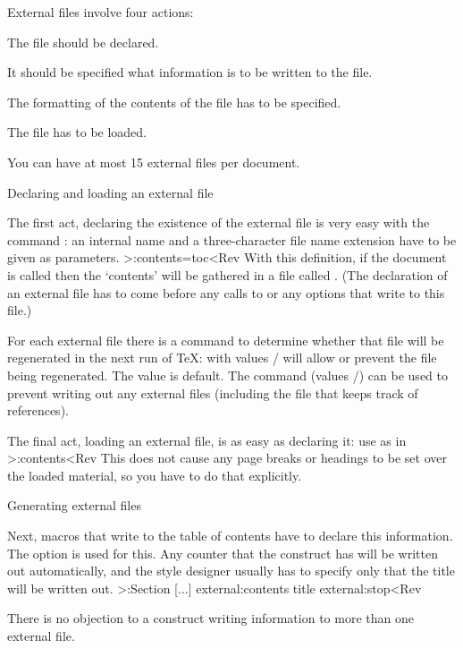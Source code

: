 External files involve four actions: 
\Enumerate\item The file should be declared.
\item It should be specified what information is to be written to the
file.
\item The formatting of the contents of the file has to be specified.
\item The file has to be loaded.
\>

You can have at most 15 external files per document.

 Declaring and loading an external file

The first act, declaring the existence of the external file is very
easy with the command :
 an internal name and a three-character file name extension have
to be given as parameters.
\Ver>\DefineExternalFile:contents=toc<Rev
With this definition, if the document is called  then
the `contents' will be gathered in a file called .
(The declaration of an external file has to come before any calls
to  or any options  that write
to this file.)

For each external file  there is a command to determine whether
that file will be regenerated in the next run of \TeX:
 with values / will allow or prevent the
file being regenerated. The value  is default. The
command  (values /)
can be used to prevent writing out any external files (including the
 file that keeps track of references).

The final act, loading an external file, is as easy as declaring it:
use  as in
\Ver>\LoadExternalFile:contents<Rev
This does not cause any page breaks or headings to be set over the
loaded material, so you have to do that explicitly.

 Generating external files

Next, macros that write to the table of contents have to declare this
information. The  option is used for this.
Any counter that the construct has will be written out
automatically, and the style designer usually has to specify only
that the title will be written out.
\Ver>\DefineHeading:Section
    [...]
    external:contents title external:stop<Rev

There is no objection to a construct writing information to more than
one external file.

